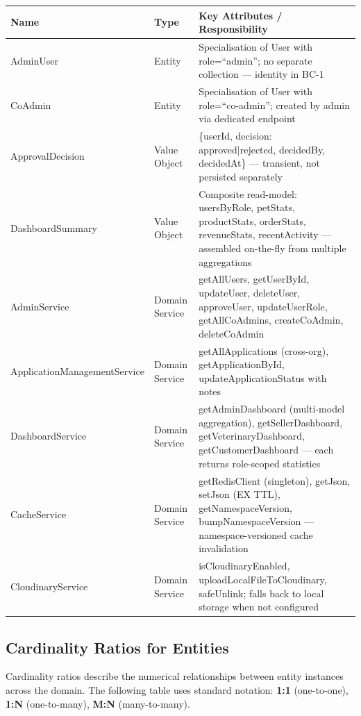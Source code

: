\documentclass[12pt,a4paper]{article}
\begin{document}
\begin{center}
\begin{tabular}{@{}p{3.5cm}p{2cm}p{8.5cm}@{}}
\toprule
\textbf{Name} & \textbf{Type} & \textbf{Key Attributes / Responsibility} \\
\midrule
AdminUser & Entity & Specialisation of User with role=``admin''; no separate collection — identity in BC-1 \\
CoAdmin & Entity & Specialisation of User with role=``co-admin''; created by admin via dedicated endpoint \\
ApprovalDecision & Value Object & \{userId, decision: approved|rejected, decidedBy, decidedAt\} — transient, not persisted separately \\
DashboardSummary & Value Object & Composite read-model: usersByRole, petStats, productStats, orderStats, revenueStats, recentActivity — assembled on-the-fly from multiple aggregations \\
AdminService & Domain Service & getAllUsers, getUserById, updateUser, deleteUser, approveUser, updateUserRole, getAllCoAdmins, createCoAdmin, deleteCoAdmin \\
ApplicationManagementService & Domain Service & getAllApplications (cross-org), getApplicationById, updateApplicationStatus with notes \\
DashboardService & Domain Service & getAdminDashboard (multi-model aggregation), getSellerDashboard, getVeterinaryDashboard, getCustomerDashboard — each returns role-scoped statistics \\
CacheService & Domain Service & getRedisClient (singleton), getJson, setJson (EX TTL), getNamespaceVersion, bumpNamespaceVersion — namespace-versioned cache invalidation \\
CloudinaryService & Domain Service & isCloudinaryEnabled, uploadLocalFileToCloudinary, safeUnlink; falls back to local storage when not configured \\
\bottomrule
\end{tabular}
\end{center}

\newpage

\subsection{Cardinality Ratios for Entities}

Cardinality ratios describe the numerical relationships between entity instances across the domain. The following table uses standard notation: \textbf{1:1} (one-to-one), \textbf{1:N} (one-to-many), \textbf{M:N} (many-to-many).
\end{document}
